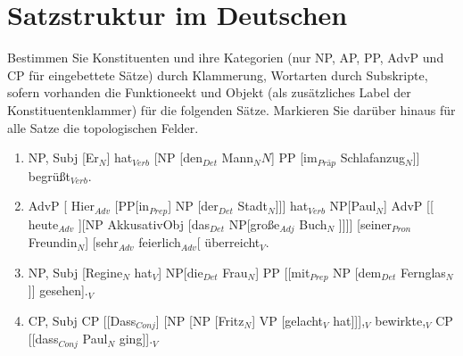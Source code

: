\section{Satzstruktur im Deutschen}
Bestimmen Sie Konstituenten und ihre Kategorien (nur NP, AP, PP, AdvP und CP für eingebettete Sätze) durch Klammerung, Wortarten durch Subskripte, sofern vorhanden die Funktioneekt und Objekt (als zusätzliches Label der Konstituentenklammer) für die folgenden Sätze.
Markieren Sie darüber hinaus für alle Satze die topologischen Felder.


\begin{enumerate}
  \item NP, Subj [Er$_{N}$] hat$_{Verb}$ [NP [den$_{Det}$ Mann$_{N}N$] PP [im$_{Präp}$ Schlafanzug$_{N}$]] begrüßt$_{Verb}$.
  \item AdvP [ Hier$_{Adv}$ [PP[in$_{Prep}$] NP [der$_{Det}$  Stadt$_{N}$]]] hat$_{Verb}$ NP[Paul$_{N}$] AdvP [[ heute$_{Adv}$ ][NP AkkusativObj [das$_{Det}$ NP[große$_{Adj}$ Buch$_{N}$ ]]]] [seiner$_{Pron}$ Freundin$_{N}$] [sehr$_{Adv}$ feierlich$_{Adv}$[ überreicht$_{V}$.
  \item NP, Subj [Regine$_{N}$ hat$_{V}$] NP[die$_{Det}$ Frau$_{N}$] PP [[mit$_{Prep}$ NP [dem$_{Det}$ Fernglas$_{N}$]] gesehen].$_{V}$
  \item CP, Subj CP [[Dass$_{Conj}$] [NP [NP [Fritz$_{N}$] VP [gelacht$_{V}$ hat]]],$_{V}$ bewirkte,$_{V}$ CP [[dass$_{Conj}$ Paul$_{N}$ ging]].$_{V}$
\end{enumerate}
